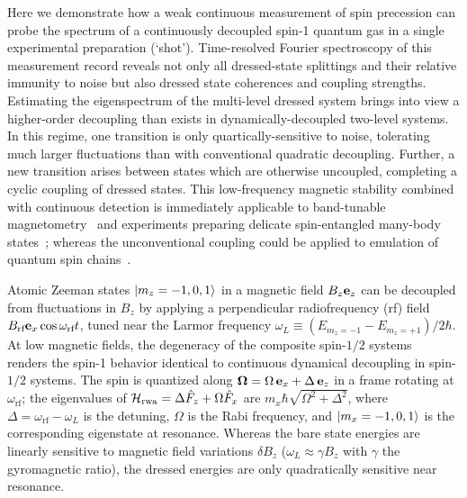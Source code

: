 \documentclass[aps,prl,reprint,superscriptaddress,floatfix]{revtex4-1}
\begin{document}
Here we demonstrate how a weak continuous measurement of spin precession can probe the spectrum of a continuously decoupled spin-1 quantum gas in a single experimental preparation (`shot').
Time-resolved Fourier spectroscopy of this measurement record reveals not only all dressed-state splittings and their relative immunity to noise but also dressed state coherences and coupling strengths.
Estimating the eigenspectrum of the multi-level dressed system brings into view a higher-order decoupling than exists in dynamically-decoupled two-level systems.
In this regime, one transition is only quartically-sensitive to noise, tolerating much larger fluctuations than with conventional quadratic decoupling.
Further, a new transition arises between states which are otherwise uncoupled, completing a cyclic coupling of dressed states. 
This low-frequency magnetic stability combined with continuous detection is immediately applicable to band-tunable magnetometry~\cite{hirose_continuous_2012,loretz_radio-frequency_2013,ockeloen_quantum_2013,*horsley_frequency-tunable_2016} and experiments preparing delicate spin-entangled many-body states~\cite{stamper-kurn_spinor_2013}; whereas the unconventional coupling could be applied to emulation of quantum spin chains~\cite{mikeska_one-dimensional_2004}.

Atomic Zeeman states $\vert m_z=-1,0,1 \rangle $ in a magnetic field $B_z \mathbf{e}_z$ can be decoupled from fluctuations in $B_z$ by applying a perpendicular radiofrequency (rf) field $B_{\text{rf}} \mathbf{e}_x \cos \omega_\text{rf} t$, tuned near the Larmor frequency $\omega_L \equiv (E_{m_z=-1}-E_{m_z=+1})/2\hbar$.
At low magnetic fields, the degeneracy of the composite spin-$1/2$ systems~\cite{majorana_atomi_1932} renders the spin-1 behavior identical to continuous dynamical decoupling in spin-$1/2$ systems.
The spin is quantized along $\mathbf{\Omega} = \Omega \, \mathbf{e}_x + \Delta \, \mathbf{e}_z$ in a frame rotating at $\omega_{\text{rf}}$; the eigenvalues of $\mathcal{H}_{\text{rwa}} = \Delta \hat{F}_z + \Omega \hat{F}_x$ are $m_x \hbar \sqrt{\Omega^2 + \Delta^2}$, where $\Delta = \omega_{\text{rf}}-\omega_L$ is the detuning, $\Omega$ is the Rabi frequency, and $\vert m_x=-1,0,1 \rangle $ is the corresponding eigenstate at resonance.
Whereas the bare state energies are linearly sensitive to magnetic field variations $\delta B_z$ ($\omega_L \approx \gamma B_z$ with $\gamma$ the gyromagnetic ratio), the dressed energies are only quadratically sensitive near resonance.
\end{document}
